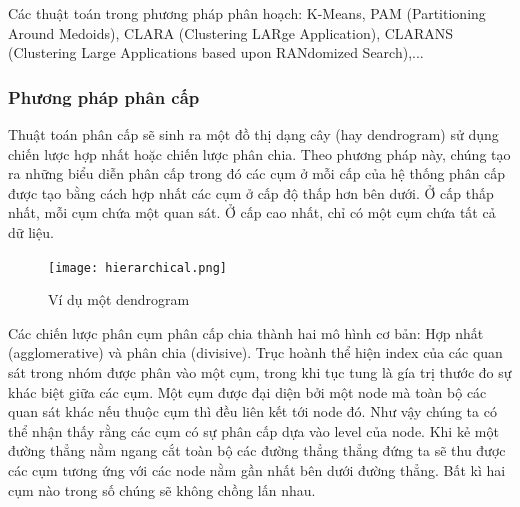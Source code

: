 \documentclass{article}
\begin{document}
    Các thuật toán trong phương pháp phân hoạch: K-Means, PAM (Partitioning Around Medoids), CLARA (Clustering LARge Application), CLARANS (Clustering Large Applications based upon RANdomized Search),...

    \subsubsection{Phương pháp phân cấp}
    Thuật toán phân cấp sẽ sinh ra một đồ thị dạng cây (hay dendrogram) sử dụng chiến lược hợp nhất hoặc chiến lược phân chia. Theo phương pháp này, chúng tạo ra những biểu diễn phân cấp trong đó các cụm ở mỗi cấp của hệ thống phân cấp được tạo bằng cách hợp nhất các cụm ở cấp độ thấp hơn bên dưới. Ở cấp thấp nhất, mỗi cụm chứa một quan sát. Ở cấp cao nhất, chỉ có một cụm chứa tất cả dữ liệu.

    \begin{figure}[H]
        \centering            \texttt{[image: hierarchical.png]} \\
        \caption{Ví dụ một dendrogram}
        \label{fig:hierarchical}
    \end{figure}

    Các chiến lược phân cụm phân cấp chia thành hai mô hình cơ bản: Hợp nhất (agglomerative) và phân chia (divisive). Trục hoành thể hiện index của các quan sát trong nhóm được phân vào một cụm, trong khi tục tung là gía trị thước đo sự khác biệt giữa các cụm. Một cụm được đại diện bởi một node mà toàn bộ các quan sát khác nếu thuộc cụm thì đều liên kết tới node đó. Như vậy chúng ta có thể nhận thấy rằng các cụm có sự phân cấp dựa vào level của node. Khi kẻ một đường thẳng nằm ngang cắt toàn bộ các đường thẳng thẳng đứng ta sẽ thu được các cụm tương ứng với các node nằm gần nhất bên dưới đường thẳng. Bất kì hai cụm nào trong số chúng sẽ không chồng lấn nhau.
\end{document}
